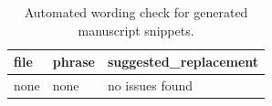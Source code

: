 \begin{table}[htbp]
\centering
\begin{tabular}{lll}
\hline
file & phrase & suggested_replacement \\
\hline
none & none & no issues found \\
\hline
\end{tabular}
\caption{Automated wording check for generated manuscript snippets.}
\label{style_check_report}
\end{table}